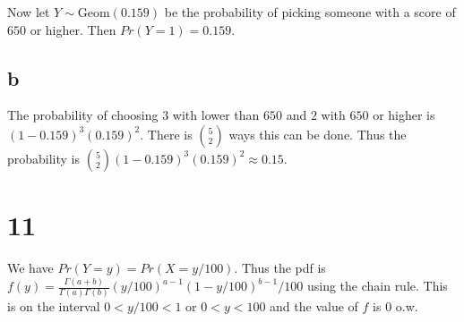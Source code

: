 \documentclass[10pt]{article}
\begin{document}
Now let $Y\sim\text{Geom}(0.159)$ be the probability of picking someone with a score of $650$ or higher. Then $Pr(Y=1)=0.159.$

\subsection*{b}
The probability of choosing $3$ with lower than $650$ and $2$ with $650$ or higher is $(1-0.159)^3(0.159)^2.$ There is $\binom{5}{2}$ ways this can be done. Thus the probability is $\binom{5}{2}(1-0.159)^3(0.159)^2\approx0.15.$

\section*{11}
We have $Pr(Y=y) = Pr(X=y/100)$. Thus the pdf is $f(y)=\frac{\Gamma(a+b)}{\Gamma(a)\Gamma(b)}(y/100)^{a-1}(1-y/100)^{b-1}/100$ using the chain rule. This is on the interval $0<y/100<1$ or $0<y<100$ and the value of $f$ is $0$ o.w. 
\end{document}
